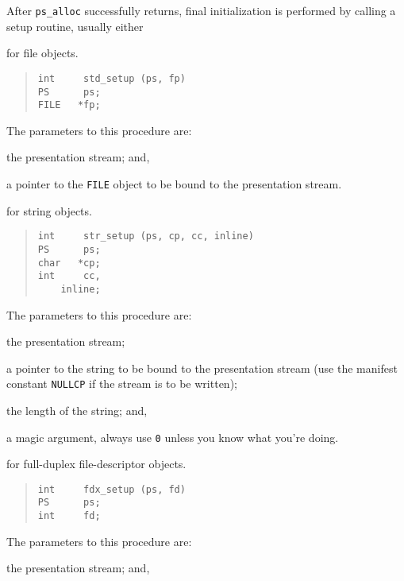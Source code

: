 After \verb"ps_alloc" successfully returns,
final initialization is performed by calling a setup routine, usually either
\begin{describe}
\item[\verb"std\_setup":] for file objects.
\begin{quote}\small\begin{verbatim}
int     std_setup (ps, fp)
PS      ps;
FILE   *fp;
\end{verbatim}\end{quote}
The parameters to this procedure are:
\begin{describe}
\item[\verb"ps":] the presentation stream;
and,

\item[\verb"fp":] a pointer to the \verb"FILE" object to be bound to the
presentation stream.
\end{describe}

\item[\verb"str\_setup":] for string objects.
\begin{quote}\small\begin{verbatim}
int     str_setup (ps, cp, cc, inline)
PS      ps;
char   *cp;
int     cc,
	inline;
\end{verbatim}\end{quote}
The parameters to this procedure are:
\begin{describe}
\item[\verb"ps":] the presentation stream;

\item[\verb"cp":] a pointer to the string to be bound to the presentation
stream
(use the manifest constant \verb"NULLCP" if the stream is to be written);

\item[\verb"cc":] the length of the string;
and,

\item[\verb"inline":] a magic argument,
always use \verb"0" unless you know what you're doing.
\end{describe}

\item[\verb"fdx\_setup":] for full-duplex file-descriptor objects.
\begin{quote}\small\begin{verbatim}
int     fdx_setup (ps, fd)
PS      ps;
int     fd;
\end{verbatim}\end{quote}
The parameters to this procedure are:
\begin{describe}
\item[\verb"ps":] the presentation stream;
and,


\end{describe}
\end{describe}

